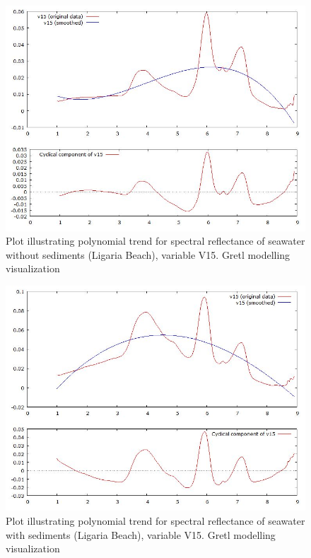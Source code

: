 \documentclass[10pt, a4paper]{article}
\begin{document}
\begin{appendices}
\begin{figure}[H]
\begin{center}
\includegraphics[scale=0.32]{G-polynom-trend-wo.jpg}
\caption{Plot illustrating polynomial trend for spectral reflectance of seawater without sediments (Ligaria Beach), variable V15. Gretl modelling visualization­}
\label{fig:57}
\end{center}
\end{figure}
\begin{figure}[H]
\begin{center}
\includegraphics[scale=0.32]{G-polynom-trend-with.jpg}
\caption{Plot illustrating polynomial trend for spectral reflectance of seawater with sediments (Ligaria Beach), variable V15. Gretl modelling visualization­}

\end{center}
\end{figure}
\end{appendices}
\end{document}
